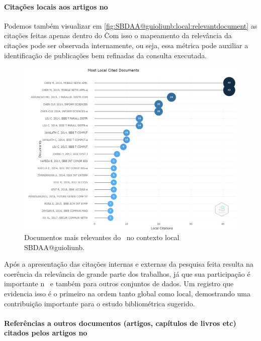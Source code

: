 \paragraph{Citações locais aos artigos no \dataset}

Podemos também visualizar em \ref{fig:SBDAA@guioliunb:local:relevantdocument} as citações feitas apenas dentro do \dataset\. Com isso o mapeamento da relevância da citações pode ser observada internamente, ou seja, essa métrica pode auxiliar a identificação de publicações bem refinadas da consulta executada.  


\begin{figure}
    \centering
    \includegraphics[angle=0,width=1\textwidth]{experiments/guioliunb/AnaliseBibliometrica/SocialBigDataAnalysis/MOST LOCAL CITED.png}
    \caption{Documentos mais relevantes do \dataset\ no contexto local   SBDAA@guioliunb.}
    \label{fig:SBDAA@guioliunb:local:relevantdocuments}
\end{figure}


Após a apresentação das citações internas e externas da pesquisa feita resulta na coerência da relevância de grande parte dos trabalhos, já que sua participação é importante n \dataset\ e também para outros conjuntos de dados. Um registro que evidencia isso é o primeiro na ordem tanto global como local, demostrando uma contribuição importante para o estudo bibliométrica sugerido.

\paragraph{Referências a outros documentos (artigos, capítulos de livros etc) citados pelos artigos no \dataset}

